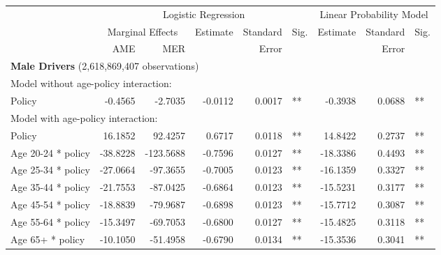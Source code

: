 
\begin{table}%
\centering 
\begin{tabular}{l r r r r l r r l} 

\hline 
 
 & \multicolumn{5}{c}{Logistic Regression}  & \multicolumn{3}{c}{Linear Probability Model} \\ 

 \cmidrule(lr){2-6}\cmidrule(lr){7-9} 
 & \multicolumn{2}{c}{Marginal Effects} & Estimate & Standard & Sig. & Estimate & Standard & Sig. \\ 

 \cmidrule(lr){2-3} 
 &   AME &  MER  &          &  Error   &      &          &  Error   &     \\ 

\hline 
 
\multicolumn{8}{l}{\textbf{Male Drivers} (2,618,869,407 observations)} \\ 

\hline
\multicolumn{8}{l}{Model without age-policy interaction: } \\ 
Policy                   &  -0.4565        &  -2.7035       &  -0.0112        &  0.0017       &   **       &  -0.3938        &  0.0688       &   **       \\ 
\hline
\multicolumn{8}{l}{Model with age-policy interaction: } \\ 
Policy                   &  16.1852        &  92.4257       &  0.6717        &  0.0118       &   **       &  14.8422        &  0.2737       &   **       \\ 
Age 20-24 * policy   &  -38.8228        &  -123.5688       &  -0.7596        &  0.0127       &   **       &  -18.3386        &  0.4493       &   **       \\ 
Age 25-34 * policy   &  -27.0664        &  -97.3655       &  -0.7005        &  0.0123       &   **       &  -16.1359        &  0.3327       &   **       \\ 
Age 35-44 * policy   &  -21.7553        &  -87.0425       &  -0.6864        &  0.0123       &   **       &  -15.5231        &  0.3177       &   **       \\ 
Age 45-54 * policy   &  -18.8839        &  -79.9687       &  -0.6898        &  0.0123       &   **       &  -15.7712        &  0.3087       &   **       \\ 
Age 55-64 * policy   &  -15.3497        &  -69.7053       &  -0.6800        &  0.0127       &   **       &  -15.4825        &  0.3118       &   **       \\ 
Age 65+ * policy   &  -10.1050        &  -51.4958       &  -0.6790        &  0.0134       &   **       &  -15.3536        &  0.3041       &   **       \\ 


\end{tabular}
\end{table}
